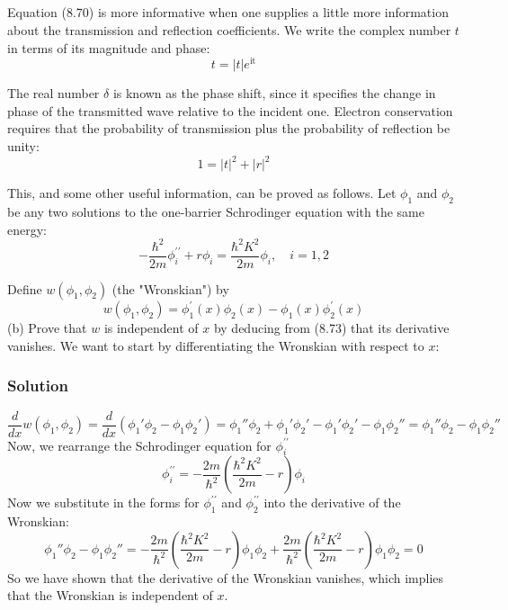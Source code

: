 \documentclass[12pt]{article}
\begin{document}
\subsection{}
Equation (8.70) is more informative when one supplies a little more information about the transmission and reflection coefficients. We write the complex number $t$ in terms of its magnitude and phase:
$$
t=|t| e^{\mathrm{it}}
$$

The real number $\delta$ is known as the phase shift, since it specifies the change in phase of the transmitted wave relative to the incident one. Electron conservation requires that the probability of transmission plus the probability of reflection be unity:
$$
1=|t|^2+|r|^2
$$

This, and some other useful information, can be proved as follows. Let $\phi_1$ and $\phi_2$ be any two solutions to the one-barrier Schrodinger equation with the same energy:
$$
-\frac{\hbar^2}{2 m} \phi_i^{\prime \prime}+r \phi_i=\frac{\hbar^2 K^2}{2 m} \phi_i, \quad i=1,2
$$

Define $w\left(\phi_1, \phi_2\right)$ (the "Wronskian") by
$$
w\left(\phi_1, \phi_2\right)=\phi_1^{\prime}(x) \phi_2(x)-\phi_1(x) \phi_2^{\prime}(x)
$$
(b) Prove that $w$ is independent of $x$ by deducing from (8.73) that its derivative vanishes.
We want to start by differentiating the Wronskian with respect to $x$:
\subsubsection{Solution}
\begin{equation}
    \frac{d}{dx}w(\phi_1, \phi_2) = \frac{d}{dx}\left(\phi_1'\phi_2 - \phi_1\phi_2'\right) = \phi_1''\phi_2 + \phi_1'\phi_2' - \phi_1'\phi_2' - \phi_1\phi_2'' = \phi_1''\phi_2 - \phi_1\phi_2''
\end{equation}
Now, we rearrange the Schrodinger equation for $\phi_i^{\prime\prime}$
\begin{equation}
    \phi_i^{\prime\prime} = -\frac{2m}{\hbar^2}\left(\frac{\hbar^2 K^2}{2m} - r\right)\phi_i
\end{equation}
Now we substitute in the forms for $\phi_1^{\prime\prime}$ and $\phi_2^{\prime\prime}$ into the derivative of the Wronskian:
\begin{equation}
    \phi_1''\phi_2 - \phi_1\phi_2'' = -\frac{2m}{\hbar^2}\left(\frac{\hbar^2 K^2}{2m} - r\right)\phi_1\phi_2 + \frac{2m}{\hbar^2}\left(\frac{\hbar^2 K^2}{2m} - r\right)\phi_1\phi_2 = 0
\end{equation}
So we have shown that the derivative of the Wronskian vanishes, which implies that the Wronskian is independent of $x$.
\end{document}
